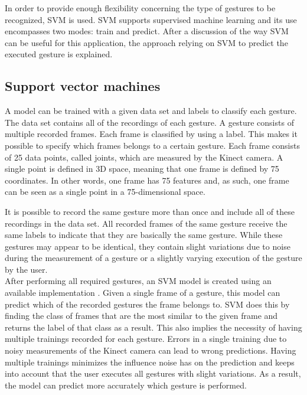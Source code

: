 In order to provide enough flexibility concerning the type of gestures to be recognized, SVM is used. SVM supports supervised machine learning and its use encompasses two modes: train and predict. After a discussion of the way SVM can be useful for this application, the approach relying on SVM to predict the executed gesture is explained.\\


\subsection{Support vector machines}

A model can be trained with a given data set and labels to classify each gesture. The data set contains all of the recordings of each gesture. A gesture consists of multiple recorded frames. Each frame is classified by using a label. This makes it possible to specify which frames belongs to a certain gesture. Each frame consists of 25 data points, called joints, which are measured by the Kinect camera. A single point is defined in 3D space, meaning that one frame is defined by 75 coordinates. In other words, one frame has 75 features and, as such, one frame can be seen as a single point in a 75-dimensional space.\\

\newpage

It is possible to record the same gesture more than once and include all of these recordings in the data set. All recorded frames of the same gesture receive the same labels to indicate that they are basically the same gesture. While these gestures may appear to be identical, they contain slight variations due to noise during the measurement of a gesture or a slightly varying execution of the gesture by the user.\\

After performing all required gestures, an SVM model is created using an available implementation \cite{LibSVM}. Given a single frame of a gesture, this model can predict which of the recorded gestures the frame belongs to. SVM does this by finding the class of frames that are the most similar to the given frame and returns the label of that class as a result. This also implies the necessity of having multiple trainings recorded for each gesture. Errors in a single training due to noisy measurements of the Kinect camera can lead to wrong predictions. Having multiple trainings minimizes the influence noise has on the prediction and keeps into account that the user executes all gestures with slight variations. As a result, the model can predict more accurately which gesture is performed.\\

